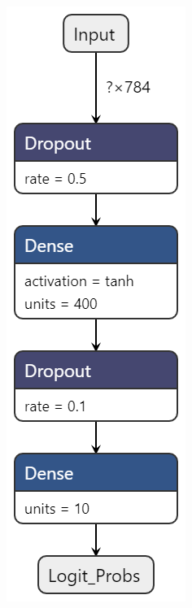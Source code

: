 \documentclass[11pt]{article}
\begin{document}
\begin{figure}[H]
    \centering
    \begin{subfigure}[c]{0.24\textwidth}
        \centering
        \includegraphics[width = \textwidth]{normal1.png}

\end{subfigure}
\end{figure}
\end{document}
